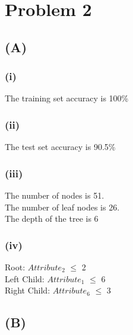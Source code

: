 \documentclass[12pt]{article}
\begin{document}
\lstset{language=[Objective]Caml}
\setlength{\fboxrule}{.5mm}\setlength{\fboxsep}{1.2mm}
\newlength{\boxlength}\setlength{\boxlength}{\textwidth}
\addtolength{\boxlength}{-4mm}
\begin{center}\end{center}
\vspace{5mm}

\section*{Problem 2}
\subsection*{(A)}
\subsubsection*{(i)}
The training set accuracy is 100\%
\subsubsection*{(ii)}
The test set accuracy is 90.5\%
\subsubsection*{(iii)}
The number of nodes is 51. \\
The number of leaf nodes is 26. \\ 
The depth of the tree is 6
\subsubsection*{(iv)}
Root: $Attribute_{2}$ $\leq$ 2 \\ 
Left Child: $Attribute_{1}$ $\leq$ 6 \\ 
Right Child: $Attribute_{6}$ $\leq$ 3 
\subsection*{(B)}
\end{document}
